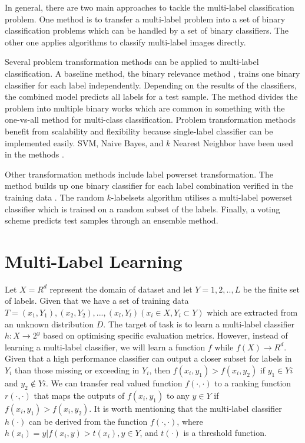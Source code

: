 In general, there are two main approaches to tackle the multi-label classification problem. One method is to transfer a multi-label problem into a set of binary classification problems which can be handled by a set of binary classifiers. The other one applies algorithms to classify multi-label images directly. 

Several problem transformation methods can be applied to multi-label classification. A baseline method, the binary relevance method \citep{read2011classifier}, trains one binary classifier for each label independently. Depending on the results of the classifiers, the combined model predicts all labels for a test sample. The method divides the problem into multiple binary works which are common in something with the one-vs-all method for multi-class classification. Problem transformation methods benefit from scalability and flexibility because single-label classifier can be implemented easily. SVM, Naive Bayes, and $k$ Nearest Neighbor have been used in the methods \citep{read2011classifier}.

Other transformation methods include label powerset transformation. The method builds up one binary classifier for each label combination verified in the training data \citep{tsoumakas2006multi}. The random $k$-labelsets algorithm \citep{tsoumakas2007random} utilises a multi-label powerset classifier which is trained on a random subset of the labels. Finally, a voting scheme predicts test samples through an ensemble method.

\section{Multi-Label Learning}
Let $X = R^d$ represent the domain of dataset and let $Y = {1,2,..,L}$ be the finite set of labels. Given that we have a set of training data $T = {(x_{1},Y_{1}),(x_{2},Y_{2}),...,(x_{l},Y_{l})} (x_{i} \in X, Y_{i} \subset Y)$ which are extracted from an unknown distribution $D$. The target of task is to learn a multi-label classifier $h: X \to 2^y $ based on optimising specific evaluation metrics. However, instead of learning a multi-label classifier, we will learn a function $f$ while $f(X) \to R^d$. Given that a high performance classifier can output a closer subset for labels in $Y_{i}$ than those missing or exceeding in $Y_{i}$, then $f(x_{i}, y_{1}) > f(x_{i}, y_{2})$ if $y_{1} \in Y{i}$ and $y_{2} \notin Y{i}$. We can transfer real valued function $f(\cdot , \cdot)$ to a ranking function $r(\cdot , \cdot)$ that maps the outputs of $f(x_{i}, y_{1})$ to any $y \in Y$ if $f(x_{i}, y_{1}) > f(x_{i}, y_{2})$. It is worth mentioning that the multi-label classifier $h(\cdot)$ can be derived from the function $f(\cdot , \cdot)$, where $h(x_{i}) = {y|f(x_{i}, y) > t(x_{i}), y \in Y}$, and $t(\cdot)$ is a threshold function.

